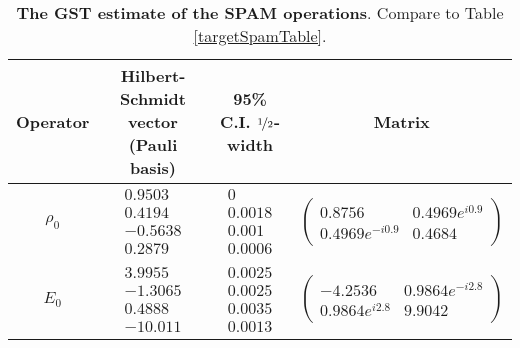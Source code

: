 \documentclass{article}[11pt]
\begin{document}
\begin{table}[h]
\begin{center}
\begin{tabular}[l]{|c|c|c|c|}
\hline
Operator & Hilbert-Schmidt vector (Pauli basis) & 95\% C.I. $\nicefrac{1}{2}$-width & Matrix \\ \hline
$\rho_{0}$ & $ \begin{array}{c}
0.9503 \\ 
0.4194 \\ 
-0.5638 \\ 
0.2879
 \end{array} $
 & $ \begin{array}{c}
0 \\ 
0.0018 \\ 
0.001 \\ 
0.0006
 \end{array} $
 & $ \left(\!\!\begin{array}{cc}
0.8756 & 0.4969e^{i0.9} \\ 
0.4969e^{-i0.9} & 0.4684
 \end{array}\!\!\right) $
 \\ \hline
$E_{0}$ & $ \begin{array}{c}
3.9955 \\ 
-1.3065 \\ 
0.4888 \\ 
-10.011
 \end{array} $
 & $ \begin{array}{c}
0.0025 \\ 
0.0025 \\ 
0.0035 \\ 
0.0013
 \end{array} $
 & $ \left(\!\!\begin{array}{cc}
-4.2536 & 0.9864e^{-i2.8} \\ 
0.9864e^{i2.8} & 9.9042
 \end{array}\!\!\right) $
 \\ \hline
\end{tabular}

\caption{\textbf{The GST estimate of the SPAM operations}.  Compare to Table \ref{targetSpamTable}.\label{bestGatesetSpamTable}}
\end{center}
\end{table}
\end{document}
